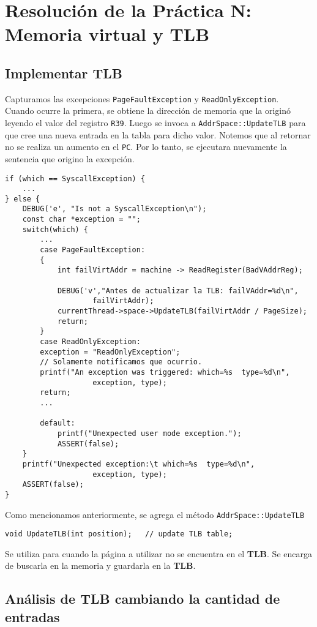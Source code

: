 \chapter{Resolución de la Práctica N: Memoria virtual y TLB}
\section{Implementar TLB} \label{update_TLB}
Capturamos las excepciones \texttt{PageFaultException} y \texttt{ReadOnlyException}.\\
Cuando ocurre la primera, se obtiene la dirección de memoria que la originó leyendo el valor del registro \texttt{R39}. Luego se invoca a \texttt{AddrSpace::UpdateTLB} para que cree una nueva entrada en la tabla para dicho valor. Notemos que al retornar no se realiza un aumento en el \texttt{PC}. Por lo tanto, se ejecutara nuevamente la sentencia que origino la excepción.
\begin{lstlisting}[style=C]
if (which == SyscallException) {
	...
} else {
	DEBUG('e', "Is not a SyscallException\n");
    const char *exception = "";
    switch(which) {
    	...
        case PageFaultException:
        {
            int failVirtAddr = machine -> ReadRegister(BadVAddrReg);

            DEBUG('v',"Antes de actualizar la TLB: failVAddr=%d\n",
                    failVirtAddr);
            currentThread->space->UpdateTLB(failVirtAddr / PageSize);
            return;
        }
        case ReadOnlyException: 
        exception = "ReadOnlyException";
        // Solamente notificamos que ocurrio.
        printf("An exception was triggered: which=%s  type=%d\n",
                    exception, type);
        return;    
        ...
        
    	default:
            printf("Unexpected user mode exception.");
            ASSERT(false);
    }
    printf("Unexpected exception:\t which=%s  type=%d\n",
                    exception, type);
    ASSERT(false);
}
\end{lstlisting}
Como mencionamos anteriormente, se agrega el método \texttt{AddrSpace::UpdateTLB}
\begin{lstlisting}[style=C]
void UpdateTLB(int position);   // update TLB table;
\end{lstlisting}
Se utiliza para cuando la página a utilizar no se encuentra en el \textbf{TLB}. Se encarga de buscarla en la memoria y guardarla en la \textbf{TLB}.
\section{Análisis de TLB cambiando la cantidad de entradas}
